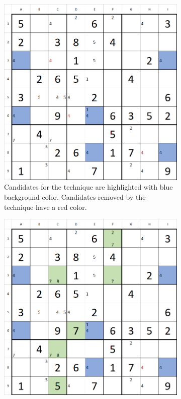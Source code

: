 \documentclass[twoside]{ausarbeitung}
\begin{document}
\begin{figure}[H]
\centering
\begin{subfigure}[t]{.475\textwidth}
  \centering
  \includegraphics[width=\linewidth]{images/sfish1.png}
  \caption{Candidates for the technique are highlighted with blue background color. Candidates removed by the technique have a red color.}
  \label{fig:sfish1}
\end{subfigure}%
\hfill
\begin{subfigure}[t]{.475\textwidth}
  \centering
  \includegraphics[width=\linewidth]{images/sfish2.png}

\end{subfigure}
\end{figure}
\end{document}
